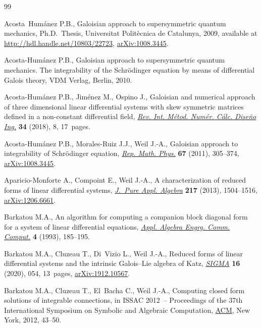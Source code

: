 \documentclass[10pt,a4paper]{amsart}
\numberwithin{equation}{section}
\begin{document}
\begin{thebibliography}{99}
\footnotesize\itemsep=0pt

Acosta~Hum\'anez P.B., Galoisian approach to supersymmetric quantum mechanics,
 Ph.D.~Thesis, {U}niversitat Polit\`ecnica de Catalunya, 2009, available at
 \url{http://hdl.handle.net/10803/22723}, \href{https://arxiv.org/abs/1008.3445}{arXiv:1008.3445}.

Acosta-Hum\'anez P.B., Galoisian approach to supersymmetric quantum mechanics.
 The integrability of the Schr\"odinger equation by means of differential
 Galois theory, {VDM} Verlag, Berlin, 2010.

Acosta-Hum\'anez P.B., Jim\'enez M., Ospino J., Galoisian and numerical
 approach of three dimensional linear differential systems with skew symmetric
 matrices defined in a non-constant differential field, \href{https://doi.org/10.23967/j.rimni.2017.7.008}{\textit{Rev. Int.
 M\'etod. Num\'er. C\'alc. Dise\~no Ing.}} \textbf{34} (2018), 8, 17~pages.

Acosta-Hum\'anez P.B., Morales-Ruiz J.J., Weil J.-A., Galoisian approach to
 integrability of {S}chr\"odinger equation, \href{https://doi.org/10.1016/S0034-4877(11)60019-0}{\textit{Rep. Math. Phys.}}
 \textbf{67} (2011), 305--374, \href{https://arxiv.org/abs/1008.3445}{arXiv:1008.3445}.

Aparicio-Monforte A., Compoint E., Weil J.-A., A characterization of reduced
 forms of linear differential systems, \href{https://doi.org/10.1016/j.jpaa.2012.11.007}{\textit{J.~Pure Appl. Algebra}}
 \textbf{217} (2013), 1504--1516, \href{https://arxiv.org/abs/1206.6661}{arXiv:1206.6661}.

Barkatou M.A., An algorithm for computing a companion block diagonal form for a
 system of linear differential equations, \href{https://doi.org/10.1007/BF01202037}{\textit{Appl. Algebra Engrg. Comm.
 Comput.}} \textbf{4} (1993), 185--195.

Barkatou M.A., Cluzeau T., Di~Vizio L., Weil J.-A., Reduced forms of linear
 differential systems and the intrinsic {G}alois--{L}ie algebra of {K}atz,
 \href{https://doi.org/10.3842/SIGMA.2020.054}{\textit{SIGMA}} \textbf{16} (2020), 054, 13~pages, \href{https://arxiv.org/abs/1912.10567}{arXiv:1912.10567}.

Barkatou M.A., Cluzeau T., El~Bacha C., Weil J.-A., Computing closed form
 solutions of integrable connections, in I{SSAC} 2012~-- {P}roceedings of the
 37th {I}nternational {S}ymposium on {S}ymbolic and {A}lgebraic {C}omputation,
 \href{https://doi.org/10.1145/2442829.2442840}{ACM}, New York, 2012, 43--50.


\end{thebibliography}
\end{document}
